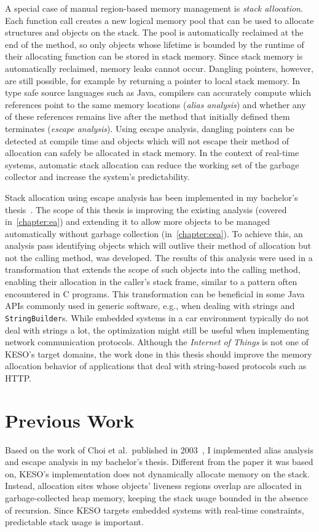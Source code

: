 		A special case of manual region-based memory management is \emph{stack allocation}. Each function call creates a new
		logical memory pool that can be used to allocate structures and objects on the stack. The pool is automatically
		reclaimed at the end of the method, so only objects whose lifetime is bounded by the runtime of their allocating
		function can be stored in stack memory. Since stack memory is automatically reclaimed, memory leaks cannot occur.
		Dangling pointers, however, are still possible, for example by returning a pointer to local stack memory. In type
		safe source languages such as Java, compilers can accurately compute which references point to the same memory
		locations (\emph{alias analysis}) and whether any of these references remains live after the method that initially
		defined them terminates (\emph{escape analysis}). Using escape analysis, dangling pointers can be detected at
		compile time and objects which will not escape their method of allocation can safely be allocated in stack memory.
		In the context of real-time systems, automatic stack allocation can reduce the working set of the garbage collector
		and increase the system's predictability.

		Stack allocation using escape analysis has been implemented in my bachelor's thesis~\cite{lang:12}. The scope of
		this thesis is improving the existing analysis (covered in~\cref{chapter:ea}) and extending it to allow more objects
		to be managed automatically without garbage collection (in~\cref{chapter:eea}). To achieve this, an analysis pass
		identifying objects which will outlive their method of allocation but not the calling method, was developed. The
		results of this analysis were used in a transformation that extends the scope of such objects into the calling
		method, enabling their allocation in the caller's stack frame, similar to a pattern often encountered in C programs.
		This transformation can be beneficial in some Java APIs commonly used in generic software, e.g., when dealing with
		strings and \texttt{StringBuilder}s. While embedded systems in a car environment typically do not deal with strings
		a lot, the optimization might still be useful when implementing network communication protocols. Although the
		\emph{Internet of Things} is not one of KESO's target domains, the work done in this thesis should improve the
		memory allocation behavior of applications that deal with string-based protocols such as HTTP.

	\section{Previous Work}
		\label{sec:intro:prev}
		Based on the work of Choi et al.\ published in 2003~\cite{choi:03:toplas}, I implemented alias analysis and escape
		analysis in my bachelor's thesis. Different from the paper it was based on, KESO's implementation does not
		dynamically allocate memory on the stack. Instead, allocation sites whose objects' liveness regions overlap are
		allocated in garbage-collected heap memory, keeping the stack usage bounded in the absence of recursion. Since KESO
		targets embedded systems with real-time constraints, predictable stack usage is important.

